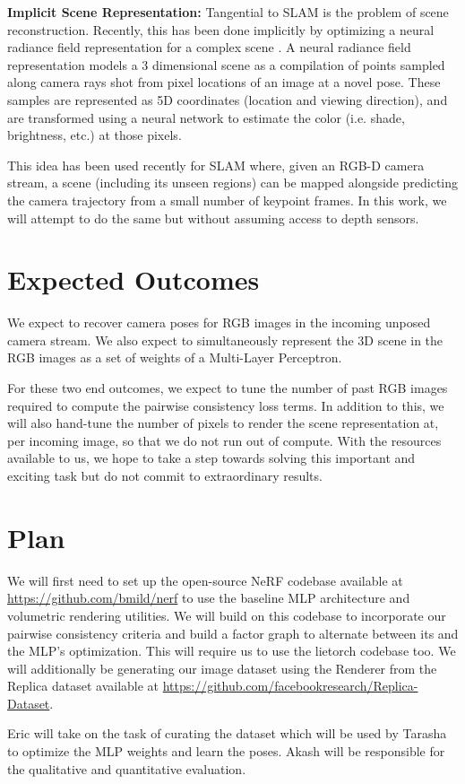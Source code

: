 \documentclass[15pt,letterpaper]{article}
\begin{document}
{\bf Implicit Scene Representation:}
Tangential to SLAM is the problem of scene reconstruction. Recently, this has been done implicitly by optimizing a neural radiance field representation for a complex scene \cite{nerf}. A neural radiance field representation models a 3 dimensional scene as a compilation of points sampled along camera rays shot from pixel locations of an image at a novel pose. These samples are represented as 5D coordinates (location and viewing direction), and are transformed using a neural network to estimate the color (i.e. shade, brightness, etc.) at those pixels.

This idea has been used recently for SLAM \cite{imap} where, given an RGB-D camera stream, a scene (including its unseen regions) can be mapped alongside predicting the camera trajectory from a small number of keypoint frames. In this work, we will attempt to do the same but without assuming access to depth sensors.

\section{Expected Outcomes}%
\label{sec:Expected Outcomes}
We expect to recover camera poses for RGB images in the incoming unposed camera stream. We also expect to simultaneously represent the 3D scene in the RGB images as a set of weights of a Multi-Layer Perceptron.

For these two end outcomes, we expect to tune the number of past RGB images required to compute the pairwise consistency loss terms. In addition to this, we will also hand-tune the number of pixels to render the scene representation at, per incoming image, so that we do not run out of compute. With the resources available to us, we hope to take a step towards solving this important and exciting task but do not commit to extraordinary results.
\section{Plan}%
\label{sec:Plan}

We will first need to set up the open-source NeRF codebase available at \hyperlink{https://github.com/bmild/nerf}{https://github.com/bmild/nerf} to use the baseline MLP architecture and volumetric rendering utilities. We will build on this codebase to incorporate our pairwise consistency criteria and build a factor graph to alternate between its and the MLP's optimization. This will require us to use the lietorch codebase too. We will additionally be generating our image dataset using the Renderer from the Replica dataset available at \hyperlink{https://github.com/facebookresearch/Replica-Dataset}{https://github.com/facebookresearch/Replica-Dataset}.

Eric will take on the task of curating the dataset which will be used by Tarasha to optimize the MLP weights and learn the poses. Akash will be responsible for the qualitative and quantitative evaluation.

\footnotesize



\end{document}
